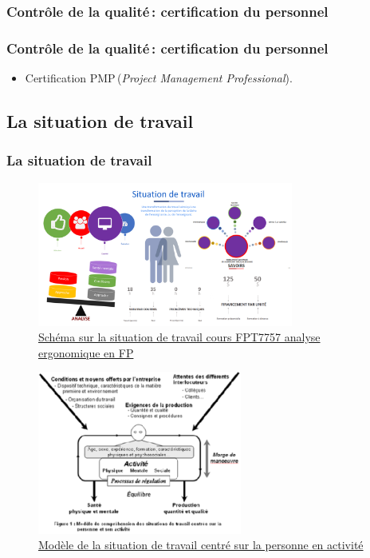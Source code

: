 					\subsubsection{Contrôle de la qualité\,: certification du personnel} 
							\begin{frame}[allowframebreaks]
							\frametitle{Contrôle de la qualité\,: certification du personnel}
                        			
							\begin{itemize}
							\item Certification PMP\textregistered\,(\textit{Project Management Professional}).
							\end{itemize}						
					\end{frame}	
								
				\subsection{La situation de travail} 
						\begin{frame}[allowframebreaks]
						\frametitle{La situation de travail}
                        			\begin{figure}
                     			\centering
                    			 \includegraphics[width = 0.75\textwidth]{situation.png}
                     			\caption{\tiny{\href{run:situation.png}{Schéma sur la situation de travail cours FPT7757 analyse ergonomique en FP}}}
                   			\end{figure}
                        			\begin{figure}
                     			\centering
                    			 \includegraphics[width = 0.6\textwidth]{vezina.png}
                     			\caption{\tiny{\href{run:vezina.png}{Modèle de la situation de travail centré sur la personne en activité \citep{saintvicent2011}}}}
                   				\end{figure}
						\end{frame}	
                        			
